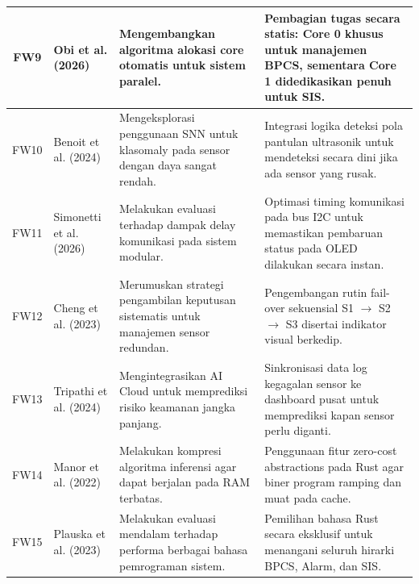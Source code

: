 \documentclass[12pt,a4paper]{article}
\begin{document}
\begin{footnotesize}
\begin{longtable}{|c|p{2.8cm}|p{5cm}|p{6.5cm}|}
FW9	& Obi et al. (2026)	& Mengembangkan algoritma alokasi core otomatis untuk sistem paralel.	& Pembagian tugas secara statis: Core 0 khusus untuk manajemen BPCS, sementara Core 1 didedikasikan penuh untuk SIS. \\ \hline
FW10 & Benoit et al. (2024)	& Mengeksplorasi penggunaan SNN untuk klasomaly pada sensor dengan daya sangat rendah.	& Integrasi logika deteksi pola pantulan ultrasonik untuk mendeteksi secara dini jika ada sensor yang rusak. \\ \hline
FW11 & Simonetti et al. (2026)	& Melakukan evaluasi terhadap dampak delay komunikasi pada sistem modular.	& Optimasi timing komunikasi pada bus I2C untuk memastikan pembaruan status pada OLED dilakukan secara instan. \\ \hline
FW12 & Cheng et al. (2023)	& Merumuskan strategi pengambilan keputusan sistematis untuk manajemen sensor redundan.	& Pengembangan rutin fail-over sekuensial S1 $\to$ S2 $\to$ S3 disertai indikator visual berkedip. \\ \hline
FW13 & Tripathi et al. (2024)	& Mengintegrasikan AI Cloud untuk memprediksi risiko keamanan jangka panjang.	& Sinkronisasi data log kegagalan sensor ke dashboard pusat untuk memprediksi kapan sensor perlu diganti. \\ \hline
FW14 & Manor et al. (2022)	& Melakukan kompresi algoritma inferensi agar dapat berjalan pada RAM terbatas.	& Penggunaan fitur zero-cost abstractions pada Rust agar biner program ramping dan muat pada cache. \\ \hline
FW15 & Plauska et al. (2023)	& Melakukan evaluasi mendalam terhadap performa berbagai bahasa pemrograman sistem.	& Pemilihan bahasa Rust secara eksklusif untuk menangani seluruh hirarki BPCS, Alarm, dan SIS. \\ \hline
\end{longtable}
\end{footnotesize}
\end{document}
